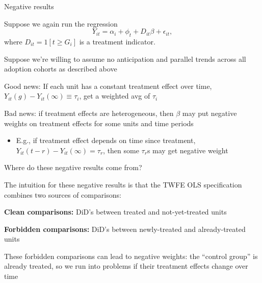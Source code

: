 \documentclass[aspectratio = 169, 13pt]{beamer}
\begin{document}
\begin{frame}{Negative results}
	\begin{wideitemize}
		\item
		Suppose we again run the regression
		\vspace{-3mm}
		$$Y_{it} = \alpha_i + \phi_t + D_{it} \beta  + \epsilon_{it}, $$
		\noindent where $D_{it} = 1[t \geq G_i]$ is a treatment indicator. 
		
		\item
		Suppose we're willing to assume no anticipation and  parallel trends across all adoption cohorts as described above
		
		\pause
		\vspace{-3mm}
		\item
		Good news: If each unit has a constant treatment effect over time, $Y_{it}(g) - Y_{it}(\infty) \equiv \tau_i$, get a weighted avg of $\tau_i$
		
		\pause
		\vspace{-3mm}
		\item
		Bad news: if treatment effects are heterogeneous, then $\beta$ may put negative weights on treatment effects for some units and time periods
		\begin{itemize}
			\item
			E.g., if treatment effect depends on time since treatment, $Y_{it}(t-r) - Y_{it}(\infty) = \tau_{r}$, then some $\tau_r$s may get negative weight
		\end{itemize}
	\end{wideitemize}
\end{frame}

\begin{frame}{Where do these negative results come from?}
	\begin{wideitemize}
		\item
		The intuition for these negative results is that the TWFE OLS specification combines two sources of comparisons:
		
		\medskip
		
		\begin{enumerate}
			{\normalsize
				\item
				\textbf{Clean comparisons:} DiD's between treated and not-yet-treated units
				
				\medskip
				
				\item
				\textbf{Forbidden comparisons:} DiD's between newly-treated and already-treated units
			}
		\end{enumerate}
		
		\item
		These forbidden comparisons can lead to negative weights: the ``control group'' is already treated, so we run into problems if their treatment effects change over time
	\end{wideitemize}
\end{frame}
\end{document}
